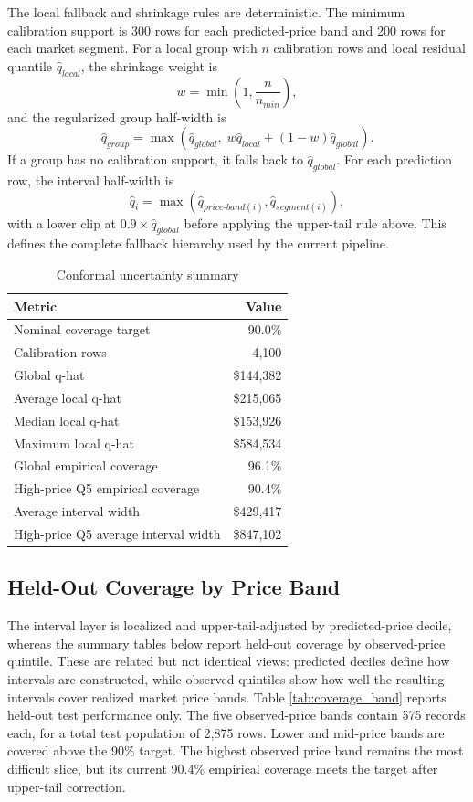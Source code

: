 \documentclass[12pt,a4paper]{article}
\begin{document}
The local fallback and shrinkage rules are deterministic. The minimum calibration support is 300 rows for each predicted-price band and 200 rows for each market segment. For a local group with $n$ calibration rows and local residual quantile $\hat{q}_{local}$, the shrinkage weight is
\[
    w = \min\left(1,\frac{n}{n_{min}}\right),
\]
and the regularized group half-width is
\[
    \hat{q}_{group} = \max\left(\hat{q}_{global},\; w\hat{q}_{local} + (1-w)\hat{q}_{global}\right).
\]
If a group has no calibration support, it falls back to $\hat{q}_{global}$. For each prediction row, the interval half-width is
\[
    \hat{q}_i = \max(\hat{q}_{price\text{-}band(i)},\hat{q}_{segment(i)}),
\]
with a lower clip at $0.9\times\hat{q}_{global}$ before applying the upper-tail rule above. This defines the complete fallback hierarchy used by the current pipeline.

\begin{table}[H]
\centering
\caption{Conformal uncertainty summary}
\label{tab:conformal}
\begin{tabular}{lr}
\toprule
\textbf{Metric} & \textbf{Value}\\
\midrule
Nominal coverage target & 90.0\%\\
Calibration rows & 4,100\\
Global q-hat & \$144,382\\
Average local q-hat & \$215,065\\
Median local q-hat & \$153,926\\
Maximum local q-hat & \$584,534\\
Global empirical coverage & 96.1\%\\
High-price Q5 empirical coverage & 90.4\%\\
Average interval width & \$429,417\\
High-price Q5 average interval width & \$847,102\\
\bottomrule
\end{tabular}
\end{table}

\subsection{Held-Out Coverage by Price Band}
The interval layer is localized and upper-tail-adjusted by predicted-price decile, whereas the summary tables below report held-out coverage by observed-price quintile. These are related but not identical views: predicted deciles define how intervals are constructed, while observed quintiles show how well the resulting intervals cover realized market price bands. Table \ref{tab:coverage_band} reports held-out test performance only. The five observed-price bands contain 575 records each, for a total test population of 2,875 rows. Lower and mid-price bands are covered above the 90\% target. The highest observed price band remains the most difficult slice, but its current 90.4\% empirical coverage meets the target after upper-tail correction.
\end{document}
